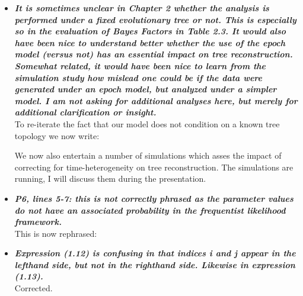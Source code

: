 \documentclass[english]{article}
\begin{document}
\begin{itemize}
\item {
{\it
\textbf{
It is sometimes unclear in Chapter 2 whether the analysis is performed under a fixed evolutionary tree or not. 
This is especially so in the evaluation of Bayes Factors in Table 2.3. 
It would also have been nice to understand better whether the use of the epoch model (versus not) has an essential impact on tree reconstruction. 
Somewhat related, it would have been nice to learn from the simulation study how mislead one could be if the data were generated under an epoch model, but analyzed under a simpler model. 
I am not asking for additional analyses here, but merely for additional clarification or insight.
}%
}%
}%
\\
To re-iterate the fact that our model does not condition on a known tree topology we now write:

\begin{quote}
\myeditsvtwo
\end{quote}

We now also entertain a number of simulations which asses the impact of correcting for time-heterogeneity on tree reconstruction. 
The simulations are running, I will discuss them during the presentation.


\item {
{\it
\textbf{
P6, lines 5-7: this is not correctly phrased as the parameter values do not have an associated probability in the frequentist likelihood framework.
}%
}%
}%
\\
This is now rephrased:

\begin{quote}
\myeditsvthree
\end{quote}


\item {
{\it
\textbf{
Expression (1.12) is confusing in that indices i and j appear in the lefthand side, but not in the righthand side. 
Likewise in expression (1.13).
}%
}%
}%
\\
Corrected.




\end{itemize}
\end{document}

